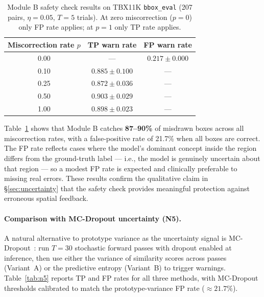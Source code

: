 \documentclass{article}
\begin{document}
\begin{table}[t]
  \caption{Module B safety check results on TBX11K \texttt{bbox\_eval} (207 pairs, $\eta=0.05$, $T=5$ trials). At zero miscorrection ($p=0$) only FP rate applies; at $p=1$ only TP rate applies.}
  \label{tab:safety}
  \centering
  \begin{tabular}{ccc}
    \toprule
    Miscorrection rate $p$ & TP warn rate & FP warn rate \\
    \midrule
    0.00 & —                   & $0.217 \pm 0.000$ \\
    0.10 & $0.885 \pm 0.100$   & — \\
    0.25 & $0.872 \pm 0.036$   & — \\
    0.50 & $0.903 \pm 0.029$   & — \\
    1.00 & $0.898 \pm 0.023$   & — \\
    \bottomrule
  \end{tabular}
\end{table}

Table~\ref{tab:safety} shows that Module B catches \textbf{87--90\%} of misdrawn boxes across all miscorrection rates, with a false-positive rate of 21.7\% when all boxes are correct.
The FP rate reflects cases where the model's dominant concept inside the region differs from the ground-truth label — i.e., the model is genuinely uncertain about that region — so a modest FP rate is expected and clinically preferable to missing real errors.
These results confirm the qualitative claim in §\ref{sec:uncertainty} that the safety check provides meaningful protection against erroneous spatial feedback.

\paragraph{Comparison with MC-Dropout uncertainty (N5).}
A natural alternative to prototype variance as the uncertainty signal is MC-Dropout~\cite{gal2016dropout}: run $T=30$ stochastic forward passes with dropout enabled at inference, then use either the variance of similarity scores across passes (Variant~A) or the predictive entropy (Variant~B) to trigger warnings.
Table~\ref{tab:n5} reports TP and FP rates for all three methods, with MC-Dropout thresholds calibrated to match the prototype-variance FP rate ($\approx 21.7\%$).
\end{document}
